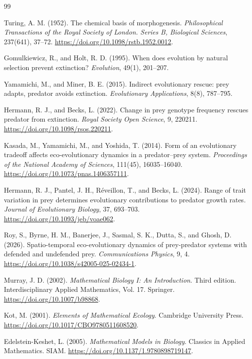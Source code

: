 \documentclass[12pt,letterpaper]{article}
\numberwithin{equation}{section}
\begin{document}
\begin{thebibliography}{99}

Turing, A. M. (1952).
The chemical basis of morphogenesis.
\emph{Philosophical Transactions of the Royal Society of London. Series B, Biological
Sciences}, 237(641), 37--72.
\url{https://doi.org/10.1098/rstb.1952.0012}.

Gomulkiewicz, R., and Holt, R. D. (1995).
When does evolution by natural selection prevent extinction?
\emph{Evolution}, 49(1), 201--207.

Yamamichi, M., and Miner, B. E. (2015).
Indirect evolutionary rescue: prey adapts, predator avoids extinction.
\emph{Evolutionary Applications}, 8(8), 787--795.

Hermann, R. J., and Becks, L. (2022).
Change in prey genotype frequency rescues predator from extinction.
\emph{Royal Society Open Science}, 9, 220211.
\url{https://doi.org/10.1098/rsos.220211}.

Kasada, M., Yamamichi, M., and Yoshida, T. (2014).
Form of an evolutionary tradeoff affects eco-evolutionary dynamics in a predator--prey
system.
\emph{Proceedings of the National Academy of Sciences}, 111(45), 16035--16040.
\url{https://doi.org/10.1073/pnas.1406357111}.

Hermann, R. J., Pantel, J. H., R{\'e}veillon, T., and Becks, L. (2024).
Range of trait variation in prey determines evolutionary contributions to predator
growth rates.
\emph{Journal of Evolutionary Biology}, 37, 693--703.
\url{https://doi.org/10.1093/jeb/voae062}.

Roy, S., Byrne, H. M., Banerjee, J., Sasmal, S. K., Dutta, S., and Ghosh, D. (2026).
Spatio-temporal eco-evolutionary dynamics of prey-predator systems with defended and
undefended prey.
\emph{Communications Physics}, 9, 4.
\url{https://doi.org/10.1038/s42005-025-02434-1}.

Murray, J. D. (2002).
\emph{Mathematical Biology I: An Introduction}.
Third edition. Interdisciplinary Applied Mathematics, Vol. 17. Springer.
\url{https://doi.org/10.1007/b98868}.

Kot, M. (2001).
\emph{Elements of Mathematical Ecology}.
Cambridge University Press.
\url{https://doi.org/10.1017/CBO9780511608520}.

Edelstein-Keshet, L. (2005).
\emph{Mathematical Models in Biology}.
Classics in Applied Mathematics. SIAM.
\url{https://doi.org/10.1137/1.9780898719147}.

\end{thebibliography}
\end{document}
